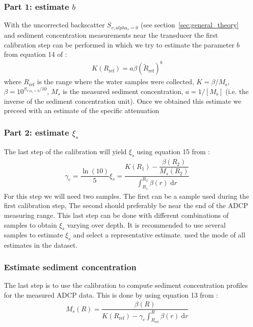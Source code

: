 \documentclass[]{article}
\begin{document}
\subsubsection{Part 1: estimate $b$}
With the uncorrected backscatter $S_{v,alpha_s=0}$ (see section~\ref{sec:general_theory} and sediment concentration measurements near the transducer the first calibration step can be performed in which we try to estimate the parameter $b$ from equation 14 of \citet{sassi2012}:
\begin{align}
  K(R_\text{ref})=a\beta(\tilde{R}_\text{ref})^b
\end{align}
where $R_\text{ref}$ is the range where the water samples were collected, $K=\beta/M_\text{s}$, $\beta=10^{S_{\text{v,}\alpha_\text{s}=0}/10}$, $M_s$ is the measured sediment concentration, $a=1/[M_\text{s}]$ (i.e. the inverse of the sediment concentration unit). 
Once we obtained this estimate we preceed with an estimate of the specific attenuation

\subsubsection{Part 2: estimate $\xi_s$}
The last step of the calibration will yield $\xi_s$ using equation 15 from \citet{sassi2012}:
\begin{align}
  \gamma_e=\dfrac{\ln(10)}{5}\xi_s=\dfrac{K(R_1)-\dfrac{\beta(R_2)}{M_s(R_2)}}{\int_{R_1}^{R_2}\beta(r)\;\text{d}r}
\end{align}
For this step we will need two samples. The first can be a sample used during the first calibration step, The second should preferably be near the end of the ADCP measuring range. This last step can be done with different combinations of samples to obtain $\xi_s$ varying over depth. It is recommended to use several samples to estimate $\xi_s$ and select a representative estimate. \citet{sassi2012} used the mode of all estimates in the dataset.


\subsubsection{Estimate sediment concentration}
The last step is to use the calibration to compute sediment concentration profiles for the measured ADCP data.
This is done by using equation 13 from \citet{sassi2012}:
\begin{align}
  M_s(R)=\dfrac{\beta(R)}{K(R_\text{ref})-\gamma_e\int_{R_\text{ref}}^R\beta(r)\;\text{d}r}
\end{align}
\end{document}
